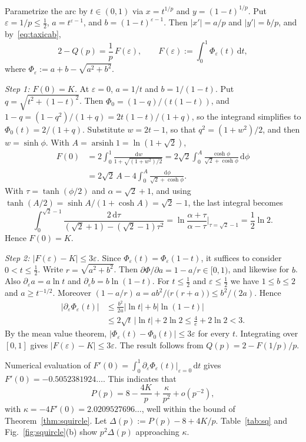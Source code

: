 \documentclass[journal]{IEEEtran}
\newcommand{\eps}{\varepsilon}
\newcommand{\dd}{\,\mathrm{d}}
\begin{document}
\begin{IEEEproof}
Parametrize the arc by $t\in(0,1)$ via $x=t^{1/p}$ and $y=(1-t)^{1/p}$. Put
$\eps=1/p\le\frac12$, $a=t^{\eps-1}$, and $b=(1-t)^{\eps-1}$. Then $|x'|=a/p$ and $|y'|=b/p$,
and by~\eqref{eq:taxicab},
\[
  2-Q(p)=\frac1p\,F(\eps),\qquad F(\eps):=\int_0^1\Phi_\eps(t)\dd t,
\]
where $\Phi_\eps:=a+b-\sqrt{a^2+b^2}$.

\emph{Step 1: $F(0)=K$.} At $\eps=0$, $a=1/t$ and $b=1/(1-t)$. Put $q=\sqrt{t^2+(1-t)^2}$.
Then $\Phi_0=(1-q)/(t(1-t))$, and $1-q=(1-q^2)/(1+q)=2t(1-t)/(1+q)$, so the integrand simplifies
to $\Phi_0(t)=2/(1+q)$. Substitute $w=2t-1$, so that $q^2=(1+w^2)/2$, and then $w=\sinh\phi$.
With $A=\operatorname{arsinh}1=\ln(1+\sqrt2)$,
\begin{align*}
  F(0)&=2\int_0^1\frac{\dd w}{1+\sqrt{(1+w^2)/2}}
       =2\sqrt2\int_0^A\frac{\cosh\phi}{\sqrt2+\cosh\phi}\dd\phi\\
      &=2\sqrt2\,A-4\int_0^A\frac{\dd\phi}{\sqrt2+\cosh\phi}.
\end{align*}
With $\tau=\tanh(\phi/2)$ and $\alpha=\sqrt2+1$, and using $\tanh(A/2)=\sinh A/(1+\cosh A)
=\sqrt2-1$, the last integral becomes
\[
  \int_0^{\sqrt2-1}\frac{2\dd\tau}{(\sqrt2+1)-(\sqrt2-1)\tau^2}
  =\ln\frac{\alpha+\tau}{\alpha-\tau}\Big|_{\tau=\sqrt2-1}=\frac12\ln2.
\]
Hence $F(0)=K$.

\emph{Step 2: $|F(\eps)-K|\le3\eps$.} Since $\Phi_\eps(t)=\Phi_\eps(1-t)$, it suffices to
consider $0<t\le\frac12$. Write $r=\sqrt{a^2+b^2}$. Then $\partial\Phi/\partial a=1-a/r\in[0,1)$,
and likewise for $b$. Also $\partial_\eps a=a\ln t$ and $\partial_\eps b=b\ln(1-t)$. For
$t\le\frac12$ and $\eps\le\frac12$ we have $1\le b\le2$ and $a\ge t^{-1/2}$. Moreover
$(1-a/r)\,a=ab^2/\bigl(r(r+a)\bigr)\le b^2/(2a)$. Hence
\begin{align*}
  |\partial_\eps\Phi_\eps(t)|&\le\frac{b^2}{2a}|\ln t|+b|\ln(1-t)|\\
  &\le2\sqrt t\,|\ln t|+2\ln2\le\frac4e+2\ln2<3.
\end{align*}
By the mean value theorem, $|\Phi_\eps(t)-\Phi_0(t)|\le3\eps$ for every $t$. Integrating over
$[0,1]$ gives $|F(\eps)-K|\le3\eps$. The result follows from $Q(p)=2-F(1/p)/p$.
\end{IEEEproof}

Numerical evaluation of $F'(0)=\int_0^1\partial_\eps\Phi_\eps(t)|_{\eps=0}\dd t$ gives
$F'(0)=-0.5052381924\ldots$. This indicates that
\begin{equation}\label{eq:kappa}
  P(p)=8-\frac{4K}{p}+\frac{\kappa}{p^2}+o(p^{-2}),
\end{equation}
with $\kappa=-4F'(0)=2.0209527696\ldots$, well within the bound of
Theorem~\ref{thm:squircle}. Let $\Delta(p):=P(p)-8+4K/p$.
Table~\ref{tab:sq} and Fig.~\ref{fig:squircle}(b) show $p^2\Delta(p)$ approaching $\kappa$.
\end{document}
